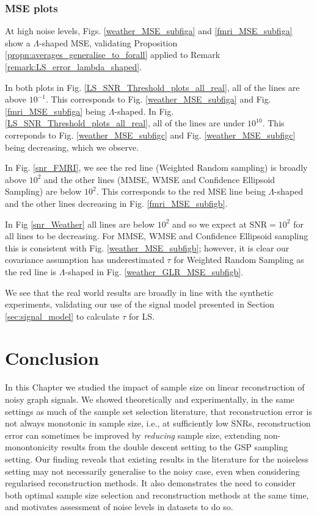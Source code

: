 {\subsubsection{MSE plots}
At high noise levels, Figs. \ref{weather_MSE_subfiga} and \ref{fmri_MSE_subfiga} show a $\Lambda$-shaped MSE, validating Proposition \ref{propn:averages_generalise_to_forall} applied to Remark \ref{remark:LS_error_lambda_shaped}. 

In both plots in Fig. \ref{LS_SNR_Threshold_plots_all_real}, all of the lines are above $10^{-1}$. This corresponds to Fig. \ref{weather_MSE_subfiga} and Fig. \ref{fmri_MSE_subfiga} being $\Lambda$-shaped. In Fig. \ref{LS_SNR_Threshold_plots_all_real}, all of the lines are under $10^{10}$. This correponds to Fig. \ref{weather_MSE_subfigc} and Fig. \ref{weather_MSE_subfigc} being decreasing, which we observe.

In Fig. \ref{snr_FMRI}, we see the red line (Weighted Random sampling) is broadly above $10^2$ and the other lines (MMSE, WMSE and Confidence Ellipsoid Sampling) are below $10^2$. This corresponds to the red MSE line being $\Lambda$-shaped and the other lines decreasing in Fig. \ref{fmri_MSE_subfigb}. 

In Fig \ref{snr_Weather} all lines are below $10^{2}$ and so we expect at $\text{SNR}=10^{2}$ for all lines to be decreasing. For MMSE, WMSE and Confidence Ellipsoid sampling this is consistent with Fig. \ref{weather_MSE_subfigb}; however, it is clear our covariance assumption has underestimated $\tau$ for Weighted Random Sampling as the red line is $\Lambda$-shaped in Fig. \ref{weather_GLR_MSE_subfigb}.


We see that the real world results are broadly in line with the synthetic experiments, validating our use of the signal model presented in Section \ref{sec:signal_model} to calculate $\tau$ for LS.

\section{Conclusion}
In this Chapter we studied the impact of sample size on linear reconstruction of noisy graph signals. We showed theoretically and experimentally, in the same settings as much of the sample set selection literature, that reconstruction error is not always monotonic in sample size, i.e., at sufficiently low SNRs, reconstruction error can sometimes be improved by \emph{reducing} sample size, {\color{blue} extending non-monontonicity results from the double descent setting to the GSP sampling setting}. %
Our finding reveals that existing results in the literature for the noiseless setting may not necessarily generalise to the noisy case,  even when considering regularised reconstruction methods. It also demonstrates the need to consider both optimal sample size selection and reconstruction methods at the same time, and motivates assessment of noise levels in datasets to do so. 

}
